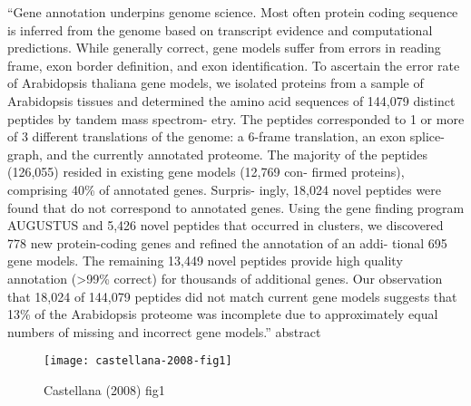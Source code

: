     ``Gene annotation underpins genome science. Most often protein coding
    sequence is inferred from the genome based on transcript evidence and
    computational predictions. While generally correct, gene models suffer from
    errors in reading frame, exon border definition, and exon identification.
    To ascertain the error rate of Arabidopsis thaliana gene models, we
    isolated proteins from a sample of Arabidopsis tissues and determined the
    amino acid sequences of 144,079 distinct peptides by tandem mass spectrom-
    etry. The peptides corresponded to 1 or more of 3 different translations of
    the genome: a 6-frame translation, an exon splice- graph, and the currently
    annotated proteome. The majority of the peptides (126,055) resided in
    existing gene models (12,769 con- firmed proteins), comprising 40\% of
    annotated genes. Surpris- ingly, 18,024 novel peptides were found that do
    not correspond to annotated genes. Using the gene finding program AUGUSTUS
    and 5,426 novel peptides that occurred in clusters, we discovered 778 new
    protein-coding genes and refined the annotation of an addi- tional 695 gene
    models. The remaining 13,449 novel peptides provide high quality annotation
    (>99\% correct) for thousands of additional genes. Our observation that
    18,024 of 144,079 peptides did not match current gene models suggests that
    13\% of the Arabidopsis proteome was incomplete due to approximately equal
    numbers of missing and incorrect gene models.'' abstract

    \begin{figure}[h!]
        \centering
        \texttt{[image: castellana-2008-fig1]}
        \caption{Castellana (2008) fig1}
    \end{figure}
    \FloatBarrier
